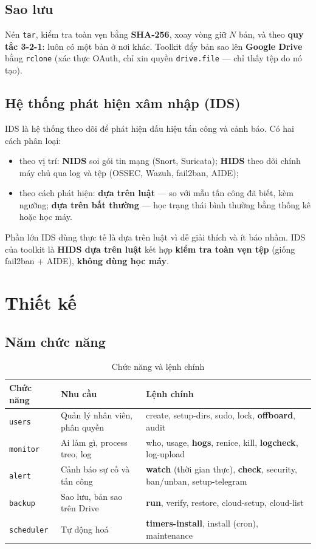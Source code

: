 \documentclass[12pt,a4paper,oneside]{report}
\newcommand{\cmd}[1]{\texttt{\small #1}}
\begin{document}
\section{Sao lưu}
Nén \cmd{tar}, kiểm tra toàn vẹn bằng \textbf{SHA-256}, xoay vòng giữ $N$ bản, và theo \textbf{quy tắc 3-2-1}: luôn có một bản ở nơi khác. Toolkit đẩy bản sao lên \textbf{Google Drive} bằng \cmd{rclone} (xác thực OAuth, chỉ xin quyền \cmd{drive.file} — chỉ thấy tệp do nó tạo).

\section{Hệ thống phát hiện xâm nhập (IDS)}
IDS là hệ thống theo dõi để phát hiện dấu hiệu tấn công và cảnh báo. Có hai cách phân loại:
\begin{itemize}
  \item theo vị trí: \textbf{NIDS} soi gói tin mạng (Snort, Suricata); \textbf{HIDS} theo dõi chính máy chủ qua log và tệp (OSSEC, Wazuh, fail2ban, AIDE);
  \item theo cách phát hiện: \textbf{dựa trên luật} — so với mẫu tấn công đã biết, kèm ngưỡng; \textbf{dựa trên bất thường} — học trạng thái bình thường bằng thống kê hoặc học máy.
\end{itemize}
Phần lớn IDS dùng thực tế là dựa trên luật vì dễ giải thích và ít báo nhầm. IDS của toolkit là \textbf{HIDS dựa trên luật} kết hợp \textbf{kiểm tra toàn vẹn tệp} (giống fail2ban + AIDE), \textbf{không dùng học máy}.

\chapter{Thiết kế}

\section{Năm chức năng}
\begin{table}[H]\centering\small
\caption{Chức năng và lệnh chính}
\begin{tabularx}{\textwidth}{>{\raggedright\arraybackslash}p{2.1cm}>{\raggedright\arraybackslash}p{4.4cm}L}
\toprule
\textbf{Chức năng} & \textbf{Nhu cầu} & \textbf{Lệnh chính}\\\midrule
\cmd{users} & Quản lý nhân viên, phân quyền & create, setup-dirs, sudo, lock, \textbf{offboard}, audit\\
\cmd{monitor} & Ai làm gì, process treo, log & who, usage, \textbf{hogs}, renice, kill, \textbf{logcheck}, log-upload\\
\cmd{alert} & Cảnh báo sự cố và tấn công & \textbf{watch} (thời gian thực), \textbf{check}, security, ban/unban, setup-telegram\\
\cmd{backup} & Sao lưu, bản sao trên Drive & \textbf{run}, verify, restore, cloud-setup, cloud-list\\
\cmd{scheduler} & Tự động hoá & \textbf{timers-install}, install (cron), maintenance\\
\bottomrule
\end{tabularx}
\end{table}
\end{document}
